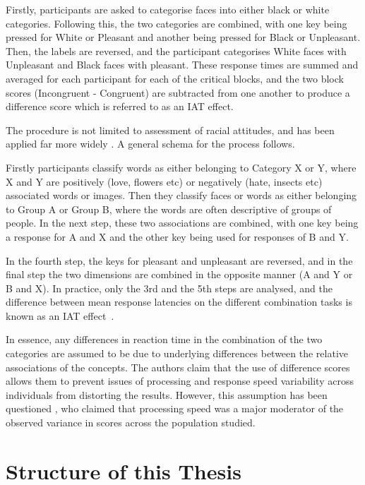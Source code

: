 Firstly, participants are asked to categorise faces into either black or white categories. Following this, the two categories are combined, with one key being pressed for White or Pleasant and another being pressed for Black or Unpleasant. Then, the labels are reversed, and the participant categorises White faces with Unpleasant and Black faces with pleasant. These response times are summed and averaged for each participant for each of the critical blocks, and the two block scores (Incongruent - Congruent) are subtracted from one another to produce a difference score which is referred to as an IAT effect. 

The procedure is not limited to assessment of racial attitudes, and has been applied far more widely \cite{Craeynest2008,Greenwald2009, Schmukle2008,Walker2008}.  A general schema for the process follows.   

Firstly participants classify words as either belonging to Category X or Y, where X and Y are positively (love, flowers etc) or negatively (hate, insects etc) associated words or images.  Then they classify faces or words
as either belonging to Group A or Group B, where the words are often descriptive of groups of people.  In the next step, these two associations are combined, with one key being a response for A and X and the other key being used for responses of B and Y. 

In the fourth step, the keys for pleasant and unpleasant are reversed, and in the final step the two dimensions are combined in the opposite manner (A and Y or B and X). In practice, only the 3rd and the 5th steps are analysed, and the difference between mean response latencies on the different combination tasks is known as an IAT effect~\cite{Greenwald1998}. 

In essence, any differences in reaction time in the combination of the two categories are assumed to be due to underlying differences between the relative associations of the concepts. The authors claim that the use of difference scores allows them to prevent issues of processing and response speed variability across individuals from distorting the results. However, this assumption has been questioned \cite{Blanton2006}, who claimed that processing speed was a major moderator of the observed variance in scores across the population studied.  

\section{Structure of this Thesis}
\label{sec:struct-this-thes}



